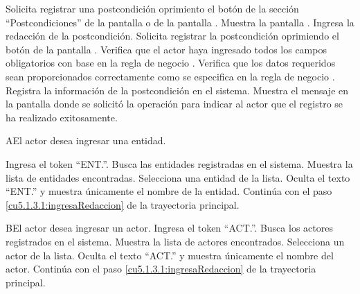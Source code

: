  \begin{UCtrayectoria}
	\UCpaso[\UCactor] Solicita registrar una postcondición oprimiento el botón \btnAgregar de la sección ``Postcondiciones'' de la pantalla  o de la pantalla . 
	\UCpaso[\UCsist] Muestra la pantalla . 
	\UCpaso[\UCactor] Ingresa la redacción de la postcondición.         \label{cu5.1.3.1:ingresaRedaccion}
	\UCpaso[\UCactor] Solicita registrar la postcondición oprimiendo el botón  de la pantalla .  
	\UCpaso[\UCsist] Verifica que el actor haya ingresado todos los campos obligatorios con base en la regla de negocio . 
	\UCpaso[\UCsist] Verifica que los datos requeridos sean proporcionados correctamente como se especifica en la regla de negocio .  
	\UCpaso[\UCsist] Registra la información de la postcondición en el sistema.
	\UCpaso[\UCsist] Muestra el mensaje  en la pantalla donde se solicitó la operación
	para indicar al actor que el registro se ha realizado exitosamente. 
\end{UCtrayectoria}

    

 \begin{UCtrayectoriaA}{A}{El actor desea ingresar una entidad.}
 	
 	 \UCpaso[\UCactor] Ingresa el token ``ENT.''.
 	\UCpaso[\UCsist] Busca las entidades registradas en el sistema. 
 	\UCpaso[\UCsist] Muestra la lista de entidades encontradas.
 	\UCpaso[\UCactor] Selecciona una entidad de la lista.
  	\UCpaso[\UCsist] Oculta el texto ``ENT.'' y muestra únicamente el nombre de la entidad.
    \UCpaso[] Continúa con el paso \ref{cu5.1.3.1:ingresaRedaccion} de la trayectoria principal.
 \end{UCtrayectoriaA}
 
 \begin{UCtrayectoriaA}{B}{El actor desea ingresar un actor.}
 	\UCpaso[\UCactor] Ingresa el token ``ACT.''.
 	\UCpaso[\UCsist] Busca los actores registrados en el sistema. 
 	\UCpaso[\UCsist] Muestra la lista de actores encontrados.
 	\UCpaso[\UCactor] Selecciona un actor de la lista.
  	\UCpaso[\UCsist] Oculta el texto ``ACT.'' y muestra únicamente el nombre del actor.
    \UCpaso[] Continúa con el paso \ref{cu5.1.3.1:ingresaRedaccion} de la trayectoria principal.
 \end{UCtrayectoriaA}

